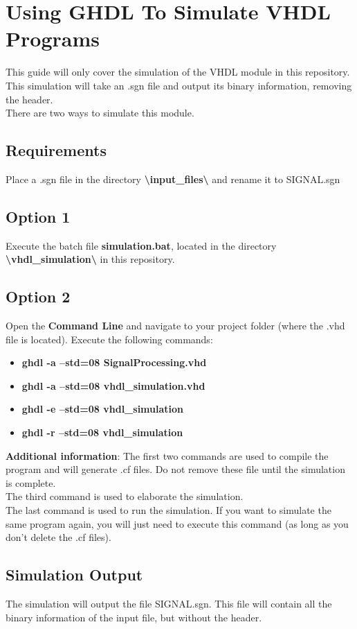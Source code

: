 \section{Using GHDL To Simulate VHDL Programs}
This guide will only cover the simulation of the VHDL module in this repository.\\
This simulation will take an .sgn file and output its binary information, removing the header.\\
There are two ways to simulate this module.
\subsection{Requirements}
Place a .sgn file in the directory \textbf{\textbackslash{}input\_files\textbackslash{}} and rename it to SIGNAL.sgn
 
\subsection{Option 1}
Execute the batch file \textbf{simulation.bat}, located in the directory \textbf{\textbackslash{}vhdl\_simulation\textbackslash{}} in this repository.

\subsection{Option 2}
Open the \textbf{Command Line} and navigate to your project folder (where the .vhd file is located).
Execute the following commands:
\begin{itemize}
  \item[] \textbf{ghdl -a --std=08 SignalProcessing.vhd}
  \item[] \textbf{ghdl -a --std=08 vhdl\_simulation.vhd}
  \item[] \textbf{ghdl -e --std=08 vhdl\_simulation}
  \item[] \textbf{ghdl -r --std=08 vhdl\_simulation}
\end{itemize}
\textbf{Additional information}: The first two commands are used to compile the program and will generate .cf files. Do not remove these file until the simulation is complete.\\
The third command is used to elaborate the simulation.\\
The last command is used to run the simulation. If you want to simulate the same program again, you will just need to execute this command (as long as you don't delete the .cf files).

\subsection{Simulation Output}
The simulation will output the file SIGNAL.sgn. This file will contain all the binary information of the input file, but without the header.